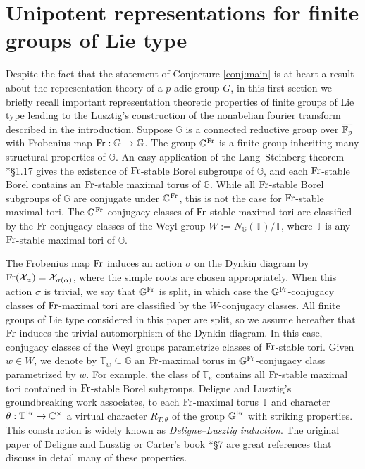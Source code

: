 \section{Unipotent representations for finite groups of Lie type}\label{sec:finite_groups}
Despite the fact that the statement of Conjecture \ref{conj:main} is at heart a result about the representation theory of a $p$-adic group $G$, in this first section we briefly recall important representation theoretic properties of finite groups of Lie type leading to the Lusztig's construction of the nonabelian fourier transform described in the introduction. Suppose $\mathbb{G}$ is a connected reductive group over $\overline{\mathbb{F}_p}$ with Frobenius map $\mathrm{Fr}:\mathbb{G}\rightarrow\mathbb{G}$. The group $\mathbb{G}^{\mathrm{Fr}}$ is a finite group inheriting many structural properties of $\mathbb{G}$. An easy application of the Lang--Steinberg theorem \cite{Carter1985}*{\S1.17} gives the existence of $\mathrm{Fr}$-stable Borel subgroups of $\mathbb{G}$, and each $\mathrm{Fr}$-stable Borel contains an $\mathrm{Fr}$-stable maximal torus of $\mathbb{G}$. While all $\mathrm{Fr}$-stable Borel subgroups of $\mathbb{G}$ are conjugate under $\mathbb{G}^{\mathrm{Fr}}$, this is not the case for $\mathrm{Fr}$-stable maximal tori. The $\mathbb{G}^{\mathrm{Fr}}$-conjugacy classes of $\mathrm{Fr}$-stable maximal tori are classified by the $\mathrm{Fr}$-conjugacy classes of the Weyl group $W:=N_{\mathbb{G}}(\mathbb{T})/\mathbb{T}$, where $\mathbb{T}$ is any $\mathrm{Fr}$-stable maximal tori of $\mathbb{G}$. 

The Frobenius map $\mathrm{Fr}$ induces an action $\sigma$ on the Dynkin diagram by $\mathrm{Fr}(\mathcal{X}_\alpha)=\mathcal{X}_{\sigma(\alpha)}$, where the simple roots are chosen appropriately. When this action $\sigma$ is trivial, we say that $\mathbb{G}^{\mathrm{Fr}}$ is split, in which case the $\mathbb{G}^{\mathrm{Fr}}$-conjugacy classes of $\mathrm{Fr}$-maximal tori are classified by the $W$-conjugacy classes. All finite groups of Lie type considered in this paper are split, so we assume hereafter that $\mathrm{Fr}$ induces the trivial automorphism of the Dynkin diagram. In this case, conjugacy classes of the Weyl groups parametrize classes of $\mathrm{Fr}$-stable tori. Given $w\in W$, we denote by $\mathbb{T}_w\subseteq\mathbb{G}$ an $\mathrm{Fr}$-maximal torus in $\mathbb{G}^{\mathrm{Fr}}$-conjugacy class parametrized by $w$. For example, the class of $\mathbb{T}_e$ contains all $\mathrm{Fr}$-stable maximal tori contained in $\mathrm{Fr}$-stable Borel subgroups. Deligne and Lusztig's groundbreaking work associates, to each $\mathrm{Fr}$-maximal torus $\mathbb{T}$ and character $\theta:\mathbb{T}^{\mathrm{Fr}}\rightarrow\mathbb{C}^\times$ a virtual character $R_{T,\theta}$ of the group $\mathbb{G}^{\mathrm{Fr}}$ with striking properties. This construction is widely known as \textit{Deligne--Lusztig induction}. The original paper of Deligne and Lusztig \cite{DeligneLusztig1976} or Carter's book \cite{Carter1985}*{\S7} are great references that discuss in detail many of these properties.

